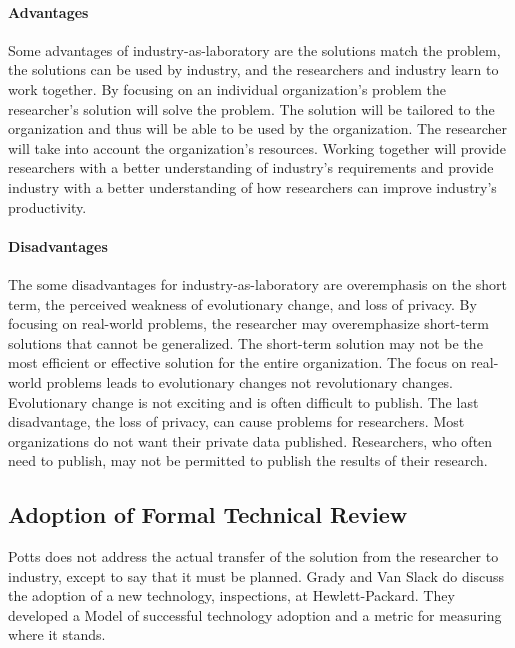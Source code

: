 \paragraph{Advantages}

Some advantages of industry-as-laboratory are the solutions match the
problem, the solutions can be used by industry, and the researchers and
industry learn to work together.  By focusing on an individual
organization's problem the researcher's solution will solve the problem.
The solution will be tailored to the organization and thus will be able to
be used by the organization.  The researcher will take into account the
organization's resources.  Working together will provide researchers with a
better understanding of industry's requirements and provide industry with a
better understanding of how researchers can improve industry's
productivity.


\paragraph{Disadvantages}

The some disadvantages for industry-as-laboratory are overemphasis on the
short term, the perceived weakness of evolutionary change, and loss of
privacy.  By focusing on real-world problems, the researcher may
overemphasize short-term solutions that cannot be generalized. The
short-term solution may not be the most efficient or effective solution for
the entire organization.  The focus on real-world problems leads to
evolutionary changes not revolutionary changes.  Evolutionary change is not
exciting and is often difficult to publish.  The last disadvantage, the
loss of privacy, can cause problems for researchers.  Most organizations do
not want their private data published.  Researchers, who often need to
publish, may not be permitted to publish the results of their research.



\subsection{Adoption of Formal Technical Review}

Potts does not address the actual transfer of the solution from the
researcher to industry, except to say that it must be planned.  Grady and
Van Slack do discuss the adoption of a new technology, inspections, at
Hewlett-Packard\cite{Grady94}.  They developed a Model of successful
technology adoption and a metric for measuring where it stands.

